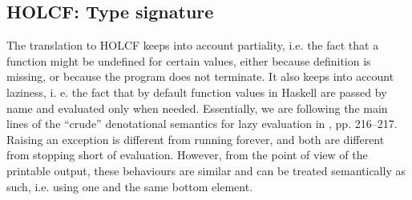 \documentclass{llncs}
\begin{document}



\subsection{HOLCF: Type signature}

The translation to HOLCF keeps into account partiality, i.e. the fact
that a function might be undefined for certain values, either because
definition is missing, or because the program does not terminate.  It
also keeps into account laziness, i. e.  the fact that by default
function values in Haskell are passed by name and evaluated only when
needed.  Essentially, we are following the main lines of the ``crude''
denotational semantics for lazy evaluation in \cite{winskel}, pp.
216--217.  Raising an exception is different from running forever, and
both are different from stopping short of evaluation. However, from
the point of view of the printable output, these behaviours are
similar and can be treated semantically as such, i.e. using one and
the same bottom element.

\end{document}
